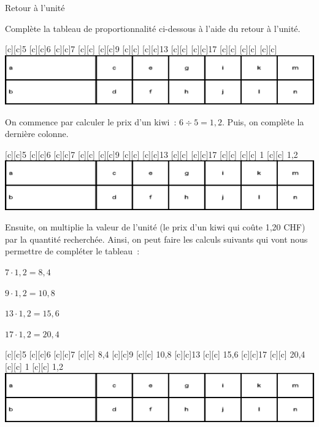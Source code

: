 \documentclass[a4paper,11pt]{report}
\begin{document}
\begin{resolu}
{Retour à l'unité}{Complète la tableau de proportionnalité ci-dessous à l'aide du retour à l'unité.
\begin{center}
[c][c]{5}
[c][c]{6}
[c][c]{7}
[c][c]{}
[c][c]{9}
[c][c]{}
[c][c]{13}
[c][c]{}
[c][c]{17}
[c][c]{}
[c][c]{}
[c][c]{}
\includegraphics[scale=.9]{media/fa-30/tableaut.eps}
\end{center}

{\color{blue}
On commence par calculer le prix d'un kiwi~: $6 \div 5 = 1,\!2.$ Puis, on complète la dernière colonne.}
\begin{center}
[c][c]{5}
[c][c]{6}
[c][c]{7}
[c][c]{}
[c][c]{9}
[c][c]{}
[c][c]{13}
[c][c]{}
[c][c]{17}
[c][c]{}
[c][c]{{\color{blue} 1}}
[c][c]{{\color{blue} 1,2}}
\includegraphics[scale=.9]{media/fa-30/tableaut.eps}
\end{center}

{\color{blue}
Ensuite, on multiplie la valeur de l'unité (le prix d'un kiwi qui coûte 1,20 CHF) par la quantité recherchée. Ainsi, on peut faire les calculs suivants qui vont nous permettre de compléter le tableau~:
\begin{multicols}{2}
$7 \cdot 1,2 =8,\!4$

$9 \cdot 1,2 =10,\!8$

$13 \cdot 1,2 =15,\!6$

$17 \cdot 1,2 =20,\!4$
\end{multicols}

}
\begin{center}
[c][c]{5}
[c][c]{6}
[c][c]{7}
[c][c]{{\color{blue} 8,4}}
[c][c]{9}
[c][c]{{\color{blue} 10,8}}
[c][c]{13}
[c][c]{{\color{blue} 15,6}}
[c][c]{17}
[c][c]{{\color{blue} 20,4}}
[c][c]{{\color{blue} 1}}
[c][c]{{\color{blue} 1,2}}
\includegraphics[scale=.9]{media/fa-30/tableaut.eps}
\end{center}




}
\end{resolu}
\end{document}
